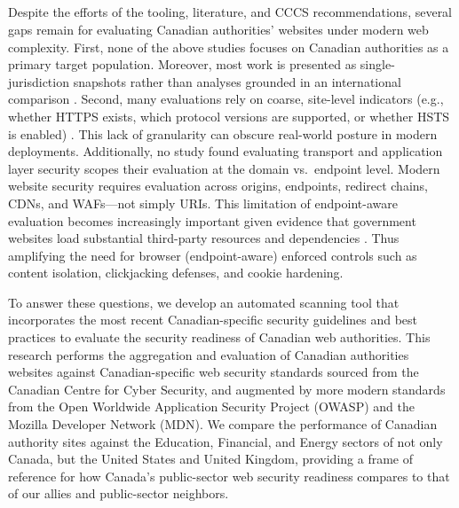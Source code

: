 \documentclass[pdflatex,sn-mathphys-num]{sn-jnl}
\numberwithin{equation}{section}
\theoremstyle{thmstyleone}
\theoremstyle{thmstyletwo}%
\theoremstyle{thmstylethree}%
\begin{document}
\subsection{\color{red}{What Is New With This Paper}}

\vspace{1em}
Despite the efforts of the tooling, literature, and CCCS recommendations, several gaps remain for evaluating
Canadian authorities’ websites under modern web complexity. First, none of the above studies focuses on
Canadian authorities as a primary target population. Moreover, most work is presented as single-jurisdiction
snapshots rather than analyses grounded in an international comparison
\cite{dunbar4240917survey,schiavone2024municipality2https,valdaserides2024automated}. Second, many evaluations
rely on coarse, site-level indicators (e.g., whether HTTPS exists, which protocol versions are supported,
or whether HSTS is enabled) \cite{dunbar4240917survey,schiavone2024municipality2https}. This lack of
 granularity can obscure real-world posture in modern deployments. Additionally, no study found evaluating
 transport and application layer security scopes their evaluation at the domain vs.\ endpoint level.
  Modern website security requires
evaluation across origins, endpoints, redirect chains, CDNs, and WAFs---not simply URIs. This limitation
of endpoint-aware evaluation becomes increasingly important given evidence that government websites load
substantial third-party resources and dependencies \cite{hsiao2019cyberautonomy}. Thus amplifying the need for
browser (endpoint-aware) enforced controls such as content isolation, clickjacking defenses, and cookie
hardening.

To answer these questions, we develop an automated scanning tool that incorporates the most recent
Canadian-specific security guidelines and best practices to evaluate the security readiness of Canadian web
authorities. This research performs the aggregation and evaluation of Canadian authorities websites against
Canadian-specific web security standards sourced from the Canadian Centre for Cyber Security, and augmented by
more modern standards from the Open Worldwide Application Security Project (OWASP) and the Mozilla Developer
Network (MDN). We compare the performance of Canadian authority sites against the Education, Financial, and
Energy sectors of not only Canada, but the United States and United Kingdom, providing a frame of reference
for how Canada's public-sector web security readiness compares to that of our allies and public-sector neighbors.
\end{document}
